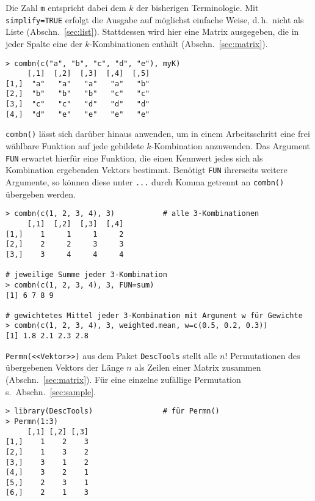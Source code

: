 Die Zahl \lstinline!m! entspricht dabei dem $k$ der bisherigen Terminologie. Mit \lstinline!simplify=TRUE! erfolgt die Ausgabe auf möglichst einfache Weise, d.\,h.\ nicht als Liste (Abschn.\ \ref{sec:list}). Stattdessen wird hier eine Matrix ausgegeben, die in jeder Spalte eine der $k$-Kombinationen enthält (Abschn.\ \ref{sec:matrix}).
\begin{lstlisting}
> combn(c("a", "b", "c", "d", "e"), myK)
     [,1]  [,2]  [,3]  [,4]  [,5]
[1,]  "a"   "a"   "a"   "a"   "b"
[2,]  "b"   "b"   "b"   "c"   "c"
[3,]  "c"   "c"   "d"   "d"   "d"
[4,]  "d"   "e"   "e"   "e"   "e"
\end{lstlisting}

\lstinline!combn()! lässt sich darüber hinaus anwenden, um in einem Arbeitsschritt eine frei wählbare Funktion auf jede gebildete $k$-Kombination anzuwenden. Das Argument \lstinline!FUN! erwartet hierfür eine Funktion, die einen Kennwert jedes sich als Kombination ergebenden Vektors bestimmt. Benötigt \lstinline!FUN! ihrerseits weitere Argumente, so können diese unter \lstinline!...! durch Komma getrennt an \lstinline!combn()! übergeben werden.
\begin{lstlisting}
> combn(c(1, 2, 3, 4), 3)           # alle 3-Kombinationen
     [,1]  [,2]  [,3]  [,4]
[1,]    1     1     1     2
[2,]    2     2     3     3
[3,]    3     4     4     4

# jeweilige Summe jeder 3-Kombination
> combn(c(1, 2, 3, 4), 3, FUN=sum)
[1] 6 7 8 9

# gewichtetes Mittel jeder 3-Kombination mit Argument w für Gewichte
> combn(c(1, 2, 3, 4), 3, weighted.mean, w=c(0.5, 0.2, 0.3))
[1] 1.8 2.1 2.3 2.8
\end{lstlisting}

\lstinline!Permn(<<Vektor>>)! aus dem Paket \lstinline!DescTools! stellt alle $n!$ Permutationen des übergebenen Vektors der Länge $n$ als Zeilen einer Matrix zusammen (Abschn.\ \ref{sec:matrix}). Für eine einzelne zufällige Permutation s.\ Abschn.\ \ref{sec:sample}.
\begin{lstlisting}
> library(DescTools)                # für Permn()
> Permn(1:3)
     [,1] [,2] [,3]
[1,]    1    2    3
[2,]    1    3    2
[3,]    3    1    2
[4,]    3    2    1
[5,]    2    3    1
[6,]    2    1    3
\end{lstlisting}

